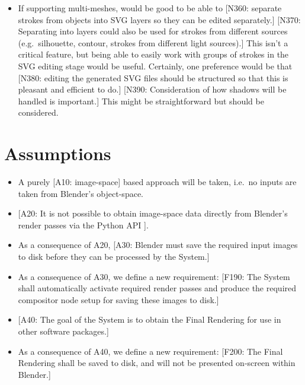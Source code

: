 \begin{itemize}
  \begin{itemize}
  \tightlist
  \item
    If supporting multi-meshes, would be good to be able to {[}N360:
    separate strokes from objects into SVG layers so they can be edited
    separately.{]} {[}N370: Separating into layers could also be used
    for strokes from different sources (e.g.~silhouette, contour,
    strokes from different light sources).{]} This isn't a critical
    feature, but being able to easily work with groups of strokes in the
    SVG editing stage would be useful. Certainly, one preference would
    be that {[}N380: editing the generated SVG files should be
    structured so that this is pleasant and efficient to do.{]} {[}N390:
    Consideration of how shadows will be handled is important.{]} This
    might be straightforward but should be considered.
  \end{itemize}
\end{itemize}

\section{Assumptions}\label{assumptions}

\begin{itemize}
\tightlist
\item
  A purely {[}A10: image-space{]} based approach will be taken, i.e.~no
  inputs are taken from Blender's object-space.
\item
  {[}A20: It is not possible to obtain image-space data directly from
  Blender's render passes via the Python API {]}.
\item
  As a consequence of A20, {[}A30: Blender must save the required input
  images to disk before they can be processed by the System.{]}
\item
  As a consequence of A30, we define a new requirement: {[}F190: The
  System shall automatically activate required render passes and produce
  the required compositor node setup for saving these images to disk.{]}
\item
  {[}A40: The goal of the System is to obtain the Final Rendering for
  use in other software packages.{]}
\item
  As a consequence of A40, we define a new requirement: {[}F200: The
  Final Rendering shall be saved to disk, and will not be presented
  on-screen within Blender.{]}
\end{itemize}

